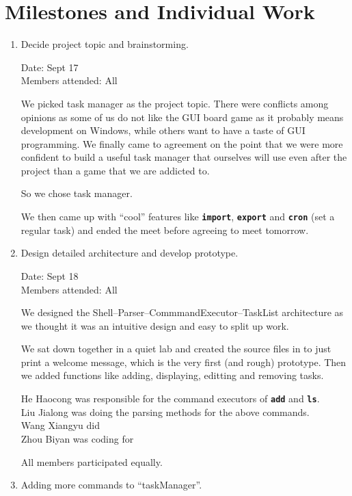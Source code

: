 \documentclass[12pt, a4paper]{article}
\newcommand{\cmdinline}[1]{{\bf \texttt{#1}}}
\begin{document}
\section{Milestones and Individual Work}
\begin{enumerate}
\item Decide project topic and brainstorming.

Date: Sept 17 \footnotemark\\
Members attended: All

We picked task manager as the project topic. There were conflicts among opinions as some of us do not like the GUI board game as it probably means development on Windows, while others want to have a taste of GUI programming. We finally came to agreement on the point that we were more confident to build a useful task manager that ourselves will use even after the project than a game that we are addicted to.

So we chose task manager.

We then came up with ``cool'' features like \cmdinline{import}, \cmdinline{export} and \cmdinline{cron} (set a regular task) and ended the meet before agreeing to meet tomorrow.

\item Design detailed architecture and develop prototype.

Date: Sept 18\\
Members attended: All

We designed the Shell--Parser--CommmandExecutor--TaskList architecture as we thought it was an intuitive design and easy to split up work.

We sat down together in a quiet lab and created the source files in to just print a welcome message, which is the very first (and rough) prototype. Then we added functions like adding, displaying, editting and removing tasks.

He Haocong was responsible for the command executors of \cmdinline{add} and \cmdinline{ls}.\\
Liu Jialong was doing the parsing methods for the above commands.\\
Wang Xiangyu did \\
Zhou Biyan was coding for 

All members participated equally.

\item Adding more commands to ``taskManager''.


\end{enumerate}
\end{document}
